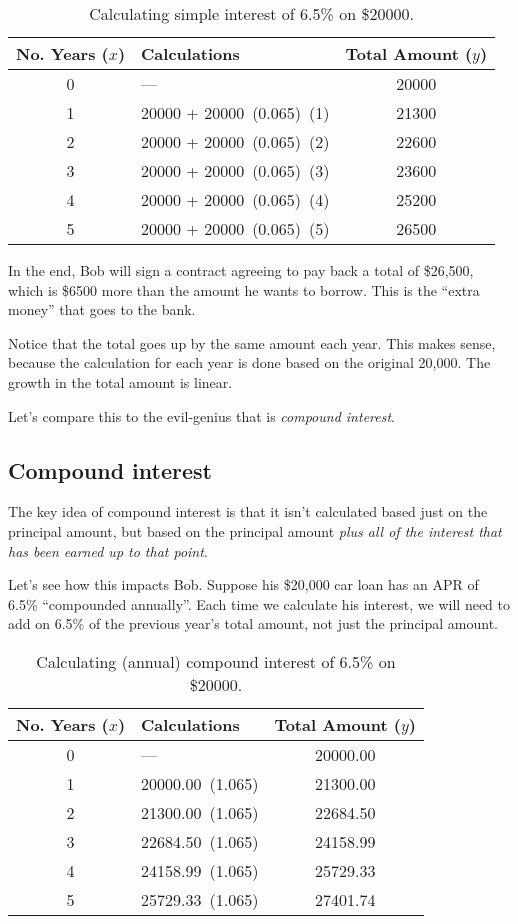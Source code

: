 \begin{table}[!htbp]
\centering
\begin{tabular}{clc}
No. Years ($x$) & Calculations & Total Amount ($y$)\\\hline
0 & --- & 20000\\
1 & 20000 + 20000~(0.065)~(1) & 21300\\
2 & 20000 + 20000~(0.065)~(2) & 22600\\
3 & 20000 + 20000~(0.065)~(3) & 23600\\
4 & 20000 + 20000~(0.065)~(4) & 25200\\
5 & 20000 + 20000~(0.065)~(5) & 26500\\
\end{tabular}
\caption{Calculating simple interest of 6.5\% on \$20000.}
\label{table:bobsimple}
\end{table}

In the end, Bob will sign a contract agreeing to pay back a total of \$26,500, which is \$6500 more than the amount he wants to borrow. This is the ``extra money'' that goes to the bank.

Notice that the total goes up by the same amount each year. This makes sense, because the calculation for each year is done based on the original 20,000. The growth in the total amount is linear.

Let's compare this to the evil-genius that is \textit{compound interest}.


\subsection{Compound interest}

The key idea of compound interest is that it isn't calculated based just on the principal amount, but based on the principal amount \textit{plus all of the interest that has been earned up to that point}.

Let's see how this impacts Bob. Suppose his \$20,000 car loan has an APR of 6.5\% ``compounded annually''. Each time we calculate his interest, we will need to add on 6.5\% of the previous year's total amount, not just the principal amount.

\begin{table}[!htbp]
\centering
\begin{tabular}{clc}
No. Years ($x$) & Calculations & Total Amount ($y$)\\\hline
0 & --- & 20000.00\\
1 & 20000.00~(1.065) & 21300.00\\
2 & 21300.00~(1.065) & 22684.50\\
3 & 22684.50~(1.065) & 24158.99\\
4 & 24158.99~(1.065) & 25729.33\\
5 & 25729.33~(1.065) & 27401.74\\
\end{tabular}
\caption{Calculating (annual) compound interest of 6.5\% on \$20000.}
\label{table:bobcompound}
\end{table}


